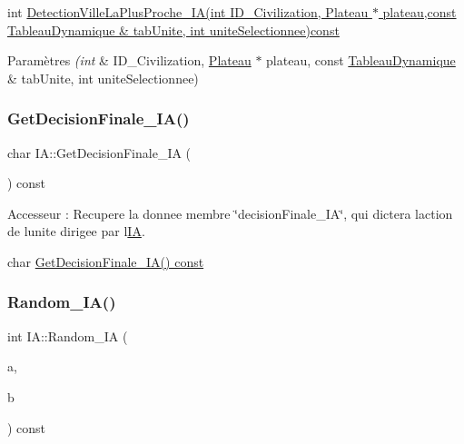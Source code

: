 int \hyperlink{classIA_a520de200c4a27aaeb8a225291f7f3c78}{Detection\+Ville\+La\+Plus\+Proche\+\_\+\+I\+A(int I\+D\+\_\+\+Civilization,  Plateau $\ast$ plateau,const Tableau\+Dynamique \& tab\+Unite, int unite\+Selectionnee)const} 
\begin{DoxyParams}{Paramètres}
{\em (int} & I\+D\+\_\+\+Civilization, \hyperlink{classPlateau}{Plateau} $\ast$ plateau, const \hyperlink{classTableauDynamique}{Tableau\+Dynamique} \& tab\+Unite, int unite\+Selectionnee) \\
\hline
\end{DoxyParams}
\mbox{\label{classIA_a65aa469e9145b022750da7f859a336d0}} 
\subsubsection{\texorpdfstring{Get\+Decision\+Finale\+\_\+\+I\+A()}{GetDecisionFinale\_IA()}}
{\footnotesize\ttfamily char I\+A\+::\+Get\+Decision\+Finale\+\_\+\+IA (\begin{DoxyParamCaption}{ }\end{DoxyParamCaption}) const}



Accesseur \+: Recupere la donnee membre \char`\"{}decision\+Finale\+\_\+\+I\+A\char`\"{}, qui dictera l\textquotesingle{}action de l\textquotesingle{}unite dirigee par l\textquotesingle{}\hyperlink{classIA}{IA}. 

char \hyperlink{classIA_a65aa469e9145b022750da7f859a336d0}{Get\+Decision\+Finale\+\_\+\+I\+A() const} \mbox{\label{classIA_a7e9db872f7a4ff8bf955fa46be231bad}} 
\subsubsection{\texorpdfstring{Random\+\_\+\+I\+A()}{Random\_IA()}}
{\footnotesize\ttfamily int I\+A\+::\+Random\+\_\+\+IA (\begin{DoxyParamCaption}\item[{int}]{a,  }\item[{int}]{b }\end{DoxyParamCaption}) const}



